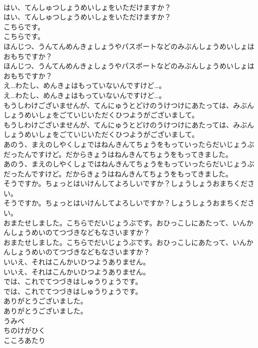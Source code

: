 \documentclass[8pt]{extreport}
\begin{document}
\begin{CJK}{UTF8}{min}
\\	はい、てんしゅつしょうめいしょをいただけますか？
\\	はい、てんしゅつしょうめいしょをいただけますか？
\\	こちらです。
\\	こちらです。
\\	ほんじつ、うんてんめんきょしょうやパスポートなどのみぶんしょうめいしょはおもちですか？
\\	ほんじつ、うんてんめんきょしょうやパスポートなどのみぶんしょうめいしょはおもちですか？
\\	え…わたし、めんきょはもっていないんですけど…。
\\	え…わたし、めんきょはもっていないんですけど…。
\\	もうしわけございませんが、てんにゅうとどけのうけつけにあたっては、みぶんしょうめいしょをごていじいただくひつようがございまして。
\\	もうしわけございませんが、てんにゅうとどけのうけつけにあたっては、みぶんしょうめいしょをごていじいただくひつようがございまして。
\\	あのう、まえのしやくしょではねんきんてちょうをもっていったらだいじょうぶだったんですけど。だからきょうはねんきんてちょうをもってきました。
\\	あのう、まえのしやくしょではねんきんてちょうをもっていったらだいじょうぶだったんですけど。だからきょうはねんきんてちょうをもってきました。
\\	そうですか。ちょっとはいけんしてよろしいですか？しょうしょうおまちください。
\\	そうですか。ちょっとはいけんしてよろしいですか？しょうしょうおまちください。
\\	おまたせしました。こちらでだいじょうぶです。おひっこしにあたって、いんかんしょうめいのてつづきなどもなさいますか？
\\	おまたせしました。こちらでだいじょうぶです。おひっこしにあたって、いんかんしょうめいのてつづきなどもなさいますか？
\\	いいえ、それはこんかいひつようありません。
\\	いいえ、それはこんかいひつようありません。
\\	では、これでてつづきはしゅうりょうです。
\\	では、これでてつづきはしゅうりょうです。
\\	ありがとうございました。
\\	ありがとうございました。
\\	うみべ
\\	ちのけがひく
\\	こころあたり

\end{CJK}
\end{document}

